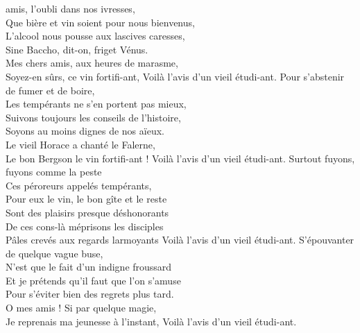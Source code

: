 
 amis, l'oubli dans nos ivresses,
\\Que bière et vin soient pour nous bienvenus,
\\L'alcool nous pousse aux lascives caresses,
\\Sine Baccho, dit-on, friget Vénus.
\\Mes chers amis, aux heures de marasme,
\\Soyez-en sûrs, ce vin fortifi-ant,
{Voilà l'avis d'un vieil étudi-ant. }
Pour s'abstenir de fumer et de boire,
\\Les tempérants ne s'en portent pas mieux,
\\Suivons toujours les conseils de l'histoire,
\\Soyons au moins dignes de nos aïeux.
\\Le vieil Horace a chanté le Falerne,
\\Le bon Bergson le vin fortifi-ant !
{Voilà l'avis d'un vieil étudi-ant. }
Surtout fuyons, fuyons comme la peste
\\Ces péroreurs appelés tempérants,
\\Pour eux le vin, le bon gîte et le reste
\\Sont des plaisirs presque déshonorants
\\De ces cons-là méprisons les disciples
\\Pâles crevés aux regards larmoyants 
{Voilà l'avis d'un vieil étudi-ant.}
S'épouvanter de quelque vague buse,
\\N'est que le fait d'un indigne froussard
\\Et je prétends qu'il faut que l'on s'amuse
\\Pour s'éviter bien des regrets plus tard.
\\O mes amis ! Si par quelque magie,
\\Je reprenais ma jeunesse à l'instant,
{Voilà l'avis d'un vieil étudi-ant. }

\breakpage